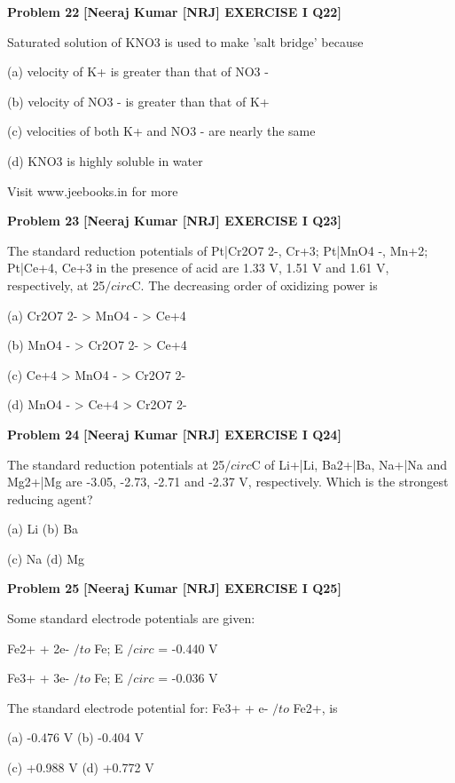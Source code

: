 \begin{problembox}
\textbf{Problem 22} \hfill \textbf{[Neeraj Kumar [NRJ] EXERCISE I Q22]}
\label{q:ext-nrj_all_questions-22}

Saturated solution of KNO3 is used to make 'salt 
bridge' because
 
 (a)  velocity of K+ is greater than that of NO3
-
 
 (b)  velocity of NO3
- is greater than that of K+
 
 (c)  velocities of both K+ and NO3
- are nearly the 
same
 
 (d) KNO3 is highly soluble in water
 
 
Visit www.jeebooks.in for more
\end{problembox}

\begin{problembox}
\textbf{Problem 23} \hfill \textbf{[Neeraj Kumar [NRJ] EXERCISE I Q23]}
\label{q:ext-nrj_all_questions-23}

The standard reduction potentials of Pt|Cr2O7
2-, 
Cr+3; Pt|MnO4
-, Mn+2; Pt|Ce+4, Ce+3 in the 
presence of acid are 1.33 V, 1.51 V and 1.61 V, 
respectively, at 25$/circ$C. The decreasing order of 
oxidizing power is
 
 (a) Cr2O7
2- > MnO4
- > Ce+4
 
 (b) MnO4
- > Cr2O7
2-
 > Ce+4
 
 (c) Ce+4 > MnO4
- > Cr2O7
2-
 
 (d) MnO4
- > Ce+4 > Cr2O7
2-
\end{problembox}

\begin{problembox}
\textbf{Problem 24} \hfill \textbf{[Neeraj Kumar [NRJ] EXERCISE I Q24]}
\label{q:ext-nrj_all_questions-24}

The standard reduction potentials at 25$/circ$C of 
Li+|Li, Ba2+|Ba, Na+|Na and Mg2+|Mg are -3.05, 
-2.73, -2.71 and -2.37  V, respectively. Which is 
the strongest reducing agent?
 
 (a) Li 
(b) Ba
 
 (c) Na 
(d) Mg
\end{problembox}

\begin{problembox}
\textbf{Problem 25} \hfill \textbf{[Neeraj Kumar [NRJ] EXERCISE I Q25]}
\label{q:ext-nrj_all_questions-25}

Some standard electrode potentials are given:
 
  Fe2+ + 2e- $/to$ Fe;  E $/circ$ = -0.440 V
 
  Fe3+ + 3e- $/to$ Fe;  E $/circ$ = -0.036 V
 
 The standard electrode potential for: Fe3+ + e- $/to$ 
Fe2+, is
 
 (a) -0.476 V 
(b) -0.404 V
 
 (c) +0.988 V 
(d) +0.772 V
\end{problembox}

